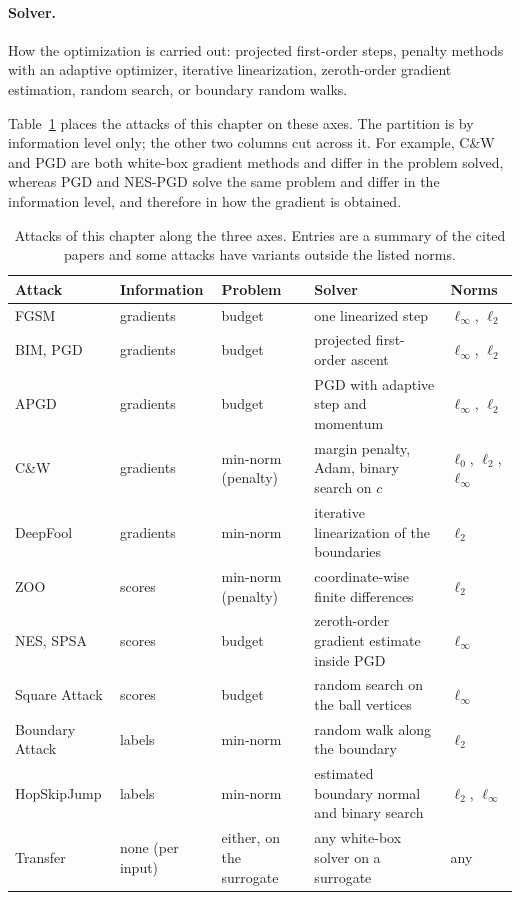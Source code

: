 \documentclass[10pt,a4paper]{extarticle}
\theoremstyle{definition}
\begin{document}
\paragraph{Solver.} How the optimization is carried out: projected first-order steps, penalty methods with an adaptive optimizer, iterative linearization, zeroth-order gradient estimation, random search, or boundary random walks.

Table~\ref{tab:taxonomy} places the attacks of this chapter on these axes. The partition is by information level only; the other two columns cut across it. For example, C\&W and PGD are both white-box gradient methods and differ in the problem solved, whereas PGD and NES-PGD solve the same problem and differ in the information level, and therefore in how the gradient is obtained.

\begin{table}[h]
\centering
\small
\renewcommand{\arraystretch}{1.15}
\begin{tabularx}{\textwidth}{@{}l l l X l@{}}
\toprule
Attack & Information & Problem & Solver & Norms \\
\midrule
FGSM & gradients & budget & one linearized step & \(\ell_\infty\), \(\ell_2\) \\
BIM, PGD & gradients & budget & projected first-order ascent & \(\ell_\infty\), \(\ell_2\) \\
APGD & gradients & budget & PGD with adaptive step and momentum & \(\ell_\infty\), \(\ell_2\) \\
C\&W & gradients & min-norm (penalty) & margin penalty, Adam, binary search on \(c\) & \(\ell_0\), \(\ell_2\), \(\ell_\infty\) \\
DeepFool & gradients & min-norm & iterative linearization of the boundaries & \(\ell_2\) \\
ZOO & scores & min-norm (penalty) & coordinate-wise finite differences & \(\ell_2\) \\
NES, SPSA & scores & budget & zeroth-order gradient estimate inside PGD & \(\ell_\infty\) \\
Square Attack & scores & budget & random search on the ball vertices & \(\ell_\infty\) \\
Boundary Attack & labels & min-norm & random walk along the boundary & \(\ell_2\) \\
HopSkipJump & labels & min-norm & estimated boundary normal and binary search & \(\ell_2\), \(\ell_\infty\) \\
Transfer & none (per input) & either, on the surrogate & any white-box solver on a surrogate & any \\
\bottomrule
\end{tabularx}
\caption{Attacks of this chapter along the three axes. Entries are a summary of the cited papers and some attacks have variants outside the listed norms.}
\label{tab:taxonomy}
\end{table}
\end{document}
